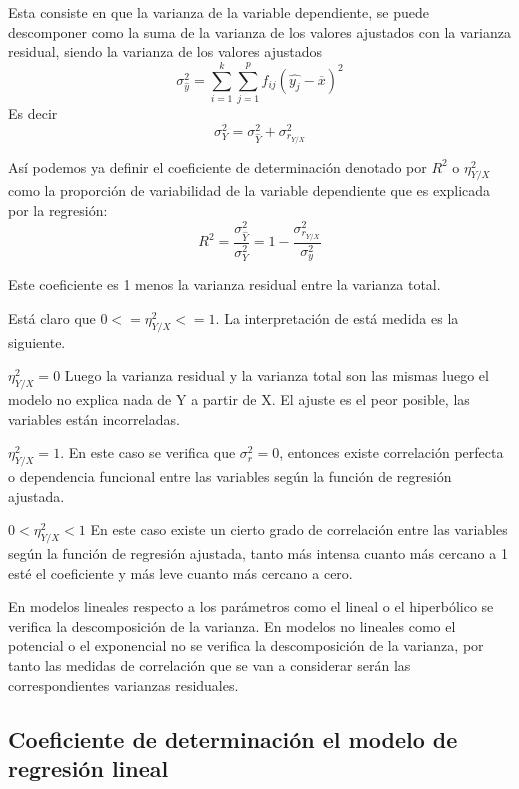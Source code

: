 \documentclass{article}
\theoremstyle{definition}
\begin{document}
	Esta consiste en que la varianza de la variable dependiente, se puede
	descomponer como la suma de la varianza de los valores ajustados con la
	varianza residual, siendo la varianza de los valores ajustados
	$$\sigma_{\hat{y}}^2 = \sum_{i=1}^k \sum_{j=1}^p f_{ij} {(\hat{y_j} -
	\overline{x})}^2 $$ Es decir $$ \sigma_Y^2 = \sigma_{\hat{Y}}^2 +
	\sigma_{r_{Y/X}}^2 $$

	Así podemos ya definir el coeficiente de determinación denotado por $R^2$ o
	$\eta_{Y/X}^2$ como la proporción de variabilidad de la variable dependiente
	que es explicada por la regresión: $$R^2 =
	\frac{\sigma_{\hat{Y}}^2}{\sigma_Y^2}  = 1 -
	\frac{\sigma_{r_{Y/X}}^2}{\sigma_y^2}$$

	Este coeficiente es 1 menos la varianza residual entre la varianza total.

	Está claro que $ 0 <= \eta_{Y/X}^2  <= 1 $. La interpretación de está medida
	es la siguiente.

\vspace{2mm}

	$ \eta_{Y/X}^2 = 0 $ Luego la varianza residual y la varianza total son las
	mismas luego el modelo no explica nada de Y a partir de X. El ajuste es el
	peor posible, las variables están incorreladas.

\vspace{2mm}

	$ \eta_{Y/X}^2 = 1 $. En este caso se verifica que $\sigma_r^2 = 0$, entonces
	existe correlación perfecta o dependencia funcional entre las variables según
	la función de regresión ajustada.

\vspace{2mm}

	$ 0 < \eta_{Y/X}^2 < 1 $  En este caso existe un cierto grado de correlación
	entre las variables según la función de regresión ajustada, tanto más intensa
	cuanto más cercano a 1 esté el coeficiente y más leve cuanto más cercano a
	cero.

En modelos lineales respecto a los parámetros como el lineal o el hiperbólico se
verifica la descomposición de la varianza. En modelos no lineales como el
potencial o el exponencial no se verifica la descomposición de la varianza, por
tanto las medidas de correlación que se van a considerar serán las
correspondientes varianzas residuales.

\subsection{Coeficiente de determinación el modelo de regresión lineal}
\end{document}
